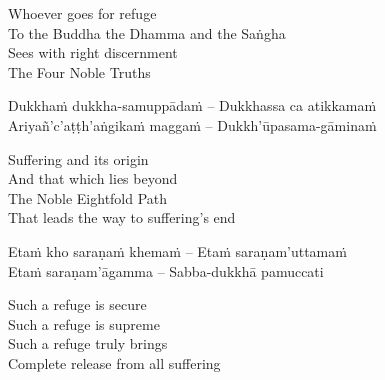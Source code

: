 \begin{english-verses}
  Whoever goes for refuge\ifdigitalversion\makeatletter\hyperlink{endnote162-appendix}\makeatother\fi\\
  To the Buddha the Dhamma and the Saṅgha\ifdigitalversion\makeatletter\hyperlink{endnote163-appendix}\makeatother\fi\\
  Sees with right discernment\\
  The Four Noble Truths
\end{english-verses}

\begin{verses}
  Dukkhaṁ dukkha-samuppādaṁ – Dukkhassa ca atikkamaṁ\\
  Ariyañ'c'aṭṭh'aṅgikaṁ maggaṁ – Dukkh'ūpasama-gāminaṁ
\end{verses}

\begin{english-verses}
  Suffering and its origin\\
  And that which lies beyond\\
  The Noble Eightfold Path\\
  That leads the way to suffering's end
\end{english-verses}

\begin{verses}
  Etaṁ kho saraṇaṁ khemaṁ – Etaṁ saraṇam'uttamaṁ\\
  Etaṁ saraṇam'āgamma – Sabba-dukkhā pamuccati
\end{verses}

\begin{english-verses}
  Such a refuge is secure\\
  Such a refuge is supreme\\
  Such a refuge truly brings\\
  Complete release from all suffering
\end{english-verses}

